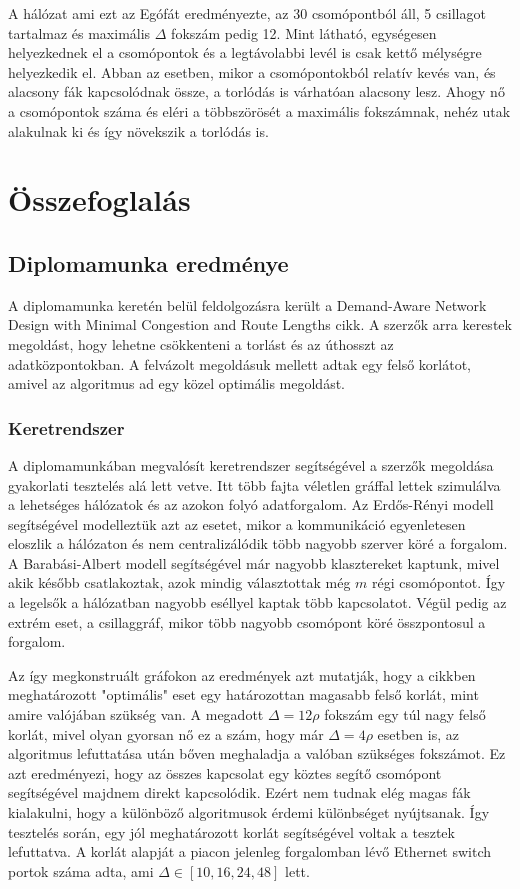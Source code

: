 \documentclass[12pt]{report}
\begin{document}
A hálózat ami ezt az Egófát eredményezte, az 30 csomópontból áll, 5 csillagot tartalmaz és maximális $\Delta$ fokszám pedig 12. 
Mint látható, egységesen helyezkednek el a csomópontok és a legtávolabbi levél is csak kettő mélységre helyezkedik el.
Abban az esetben, mikor a csomópontokból relatív kevés van, és alacsony fák kapcsolódnak össze, a torlódás is várhatóan alacsony lesz. 
Ahogy nő a csomópontok száma és eléri a többszörösét a maximális fokszámnak, nehéz utak alakulnak ki és így növekszik a torlódás is.

\chapter{Összefoglalás}

\section{Diplomamunka eredménye}

A diplomamunka keretén belül feldolgozásra került a Demand-Aware Network Design with Minimal Congestion and Route Lengths \cite{avin_demand-aware_nodate} cikk.
A szerzők arra kerestek megoldást, hogy lehetne csökkenteni a torlást és az úthosszt az adatközpontokban.
A felvázolt megoldásuk mellett adtak egy felső korlátot, amivel az algoritmus ad egy közel optimális megoldást.

\subsection{Keretrendszer}

A diplomamunkában megvalósít keretrendszer segítségével a szerzők megoldása gyakorlati tesztelés alá lett vetve.
Itt több fajta véletlen gráffal lettek szimulálva a lehetséges hálózatok és az azokon folyó adatforgalom.
Az Erdős-Rényi modell segítségével modelleztük azt az esetet, mikor a kommunikáció egyenletesen eloszlik a hálózaton és nem centralizálódik több nagyobb szerver köré a forgalom.
A Barabási-Albert modell segítségével már nagyobb klasztereket kaptunk, mivel akik később csatlakoztak, azok mindig választottak még $m$ régi csomópontot.
Így a legelsők a hálózatban nagyobb eséllyel kaptak több kapcsolatot.
Végül pedig az extrém eset, a csillaggráf, mikor több nagyobb csomópont köré összpontosul a forgalom.

Az így megkonstruált gráfokon az eredmények azt mutatják, hogy a cikkben meghatározott "optimális" eset egy határozottan magasabb felső korlát, mint amire valójában szükség van.
A megadott $\Delta = 12\rho$ fokszám egy túl nagy felső korlát, mivel olyan gyorsan nő ez a szám, hogy már $\Delta = 4\rho$ esetben is, az algoritmus lefuttatása után bőven meghaladja a valóban szükséges fokszámot.
Ez azt eredményezi, hogy az összes kapcsolat egy köztes segítő csomópont segítségével majdnem direkt kapcsolódik.
Ezért nem tudnak elég magas fák kialakulni, hogy a különböző algoritmusok érdemi különbséget nyújtsanak.
Így tesztelés során, egy jól meghatározott korlát segítségével voltak a tesztek lefuttatva. 
A korlát alapját a piacon jelenleg forgalomban lévő Ethernet switch portok száma adta, ami $\Delta \in [10, 16, 24, 48]$ lett.
\end{document}
